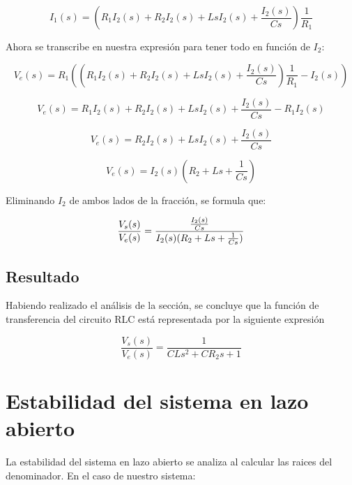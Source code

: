 \documentclass[letterpaper,11pt]{article}
\begin{document}
\begin{equation*}
I_{1}(s)=(R_{1}I_{2}(s)+R_{2}I_{2}(s)+LsI_{2}(s)+\frac{I_{2}(s)}{Cs})\frac{1%
}{R_{1}}
\end{equation*}

Ahora se transcribe en nuestra expresi\'{o}n para tener todo en funci\'{o}n
de $I_{2}$:

\begin{equation*}
V_{e}(s)=R_{1}((R_{1}I_{2}(s)+R_{2}I_{2}(s)+LsI_{2}(s)+\frac{I_{2}(s)}{Cs})%
\frac{1}{R_{1}}-I_{2}(s))
\end{equation*}

\begin{equation*}
V_{e}(s)=R_{1}I_{2}(s)+R_{2}I_{2}(s)+LsI_{2}(s)+\frac{I_{2}(s)}{Cs}%
-R_{1}I_{2}(s)
\end{equation*}

\begin{equation*}
V_{e}(s)=R_{2}I_{2}(s)+LsI_{2}(s)+\frac{I_{2}(s)}{Cs}
\end{equation*}

\begin{equation*}
V_{e}(s)=I_{2}(s)(R_{2}+Ls+\frac{1}{Cs})
\end{equation*}

Eliminando $I_{2}$ de ambos lados de la fracci\'{o}n, se formula que:

\begin{equation*}
\frac{V_{s}(s)}{V_{e}(s)}=\frac{\frac{I_{2}(s)}{Cs}}{I_{2}(s)(R_{2}+Ls+\frac{%
1}{Cs})}
\end{equation*}

\subsection{Resultado}

Habiendo realizado el an\'{a}lisis de la secci\'{o}n, se concluye que la
funci\'{o}n de transferencia del circuito RLC est\'{a} representada por la
siguiente expresi\'{o}n

\begin{equation*}
\frac{V_{s}(s)}{V_{e}(s)}=\frac{1}{CLs^{2}+CR_{2}s+1}\allowbreak
\end{equation*}

\section{Estabilidad del sistema en lazo abierto}

La estabilidad del sistema en lazo abierto se analiza al calcular las raices
del denominador. En el caso de nuestro sistema:
\end{document}
